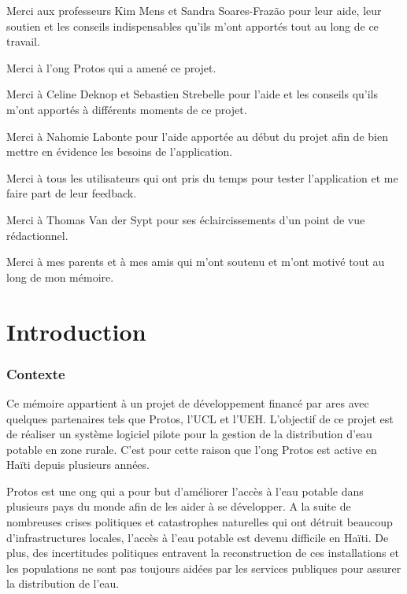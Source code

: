 \documentclass{EPL-master-thesis-covers-FR}
\begin{document}
		Merci aux professeurs Kim Mens et Sandra Soares-Frazão pour leur aide, leur soutien et les conseils indispensables qu'ils m'ont apportés tout au long de ce travail.
		
		Merci à l'\gls{ong} Protos qui a amené ce projet.
		
		Merci à Celine Deknop et Sebastien Strebelle pour l'aide et les conseils qu'ils m'ont apportés à différents moments de ce projet.
		
		Merci à Nahomie Labonte pour l'aide apportée au début du projet afin de bien mettre en évidence les besoins de l'application.
		
		Merci à tous les utilisateurs qui ont pris du temps pour tester l'application et me faire part de leur feedback.
		
		Merci à Thomas Van der Sypt pour ses éclaircissements d'un point de vue rédactionnel.
				
		Merci à mes parents et à mes amis qui m'ont soutenu et m'ont motivé tout au long de mon mémoire.

		

	\printnoidxglossary[title=Glossaire, toctitle=Glossaire]
	\glsaddall

	\chapter{Introduction}

		
		\subsection*{Contexte}
		
			Ce mémoire appartient à un projet de développement financé par \gls{ares} avec quelques partenaires tels que Protos, l'UCL et l'UEH. L'objectif de ce projet est de réaliser un système logiciel pilote pour la gestion de la distribution d'eau potable en zone rurale. C'est pour cette raison que l'\gls{ong} Protos est active en Haïti depuis plusieurs années.
			
			Protos est une \gls{ong} qui a pour but d'améliorer l'accès à l'eau potable dans plusieurs pays du monde afin de les aider à se développer. A la suite de nombreuses crises politiques et catastrophes naturelles qui ont détruit beaucoup d'infrastructures locales, l'accès à l'eau potable est devenu difficile en Haïti. De plus, des incertitudes politiques entravent la reconstruction de ces installations et les populations ne sont pas toujours aidées par les services publiques pour assurer la distribution de l'eau. 
			
\end{document}
